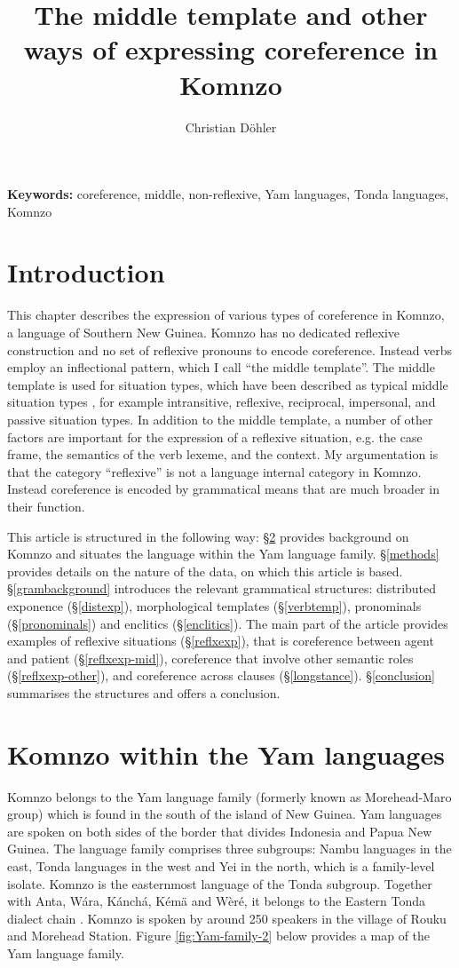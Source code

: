 \documentclass[output=paper]{langscibook}
\author{Christian Döhler\affiliation{Leibniz-Zentrum Allgemeine Sprachwissenschaft, Berlin}}
\title{{The middle template and other ways of expressing coreference in Komnzo}}
\affiliation{Leibniz-Zentrum Allgemeine Sprachwissenschaft, Berlin}
\date{}
\begin{document}
\maketitle

\textbf{Keywords:} coreference, middle, non-reflexive, Yam languages, Tonda languages, Komnzo


\section{Introduction}\label{intro}
This chapter describes the expression of various types of coreference in Komnzo, a language of Southern New Guinea. Komnzo has no dedicated reflexive construction and no set of reflexive pronouns to encode coreference. Instead verbs employ an inflectional pattern, which I call ``the middle template''. The middle template is used for situation types, which have been described as typical middle situation types \citep{Kemmer1993}, for example intransitive, reflexive, reciprocal, impersonal, and passive situation types. In addition to the middle template, a number of other factors are important for the expression of a reflexive situation, e.g. the case frame, the semantics of the verb lexeme, and the context. My argumentation is that the category ``reflexive'' is not a language internal category in Komnzo. Instead coreference is encoded by grammatical means that are much broader in their function.

This article is structured in the following way: \S\ref{yamlanguages} provides background on Komnzo and situates the language within the Yam language family. \S\ref{methods} provides details on the nature of the data, on which this article is based. \S\ref{grambackground} introduces the relevant grammatical structures: distributed exponence (\S\ref{distexp}), morphological templates (\S\ref{verbtemp}), pronominals (\S\ref{pronominals}) and enclitics (\S\ref{enclitics}). The main part of the article provides examples of reflexive situations (\S\ref{reflxexp}), that is coreference between agent and patient (\S\ref{reflxexp-mid}), coreference that involve other semantic roles (\S\ref{reflxexp-other}), and coreference across clauses (\S\ref{longstance}). \S\ref{conclusion} summarises the structures and offers a conclusion.
\section{Komnzo within the Yam languages}\label{yamlanguages}
Komnzo belongs to the Yam language family (formerly known as Morehead-Maro group) which is found in the south of the island of New Guinea. Yam languages are spoken on both sides of the border that divides Indonesia and Papua New Guinea. The language family comprises three subgroups: Nambu languages in the east, Tonda languages in the west and Yei in the north, which is a family-level isolate. Komnzo is the easternmost language of the Tonda subgroup. Together with Anta, Wára, Kánchá, Kémä and Wèré, it belongs to the Eastern Tonda dialect chain \citep[36]{Doehler2018}. Komnzo is spoken by around 250 speakers in the village of Rouku and Morehead Station. Figure \ref{fig:Yam-family-2} below provides a map of the Yam language family.
\end{document}
